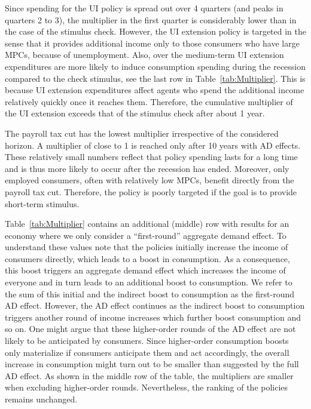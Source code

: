 \documentclass{econsocart}
\begin{document}
Since spending for the UI policy is spread out over 4 quarters (and peaks in quarters 2 to 3), the multiplier in the first quarter is considerably lower than in the case of the stimulus check.
However, the UI extension policy is targeted in the sense that it provides additional income only to those consumers who have large MPCs, because of unemployment.
Also, over the medium-term UI extension expenditures   are more likely to induce consumption spending during the recession compared to the check stimulus, see the last row in Table~\ref{tab:Multiplier}.
This is because UI extension expenditures affect agents who spend the additional income relatively quickly once it reaches them.
Therefore, the cumulative multiplier of the UI extension exceeds that of the stimulus check after about 1 year.



The payroll tax cut has the lowest multiplier irrespective of the considered horizon.
A multiplier of close to 1 is reached only after 10 years with AD effects.
These relatively small numbers reflect that policy spending lasts for a long time and is thus more likely to occur after the recession has ended.
Moreover, only employed consumers, often with relatively low MPCs, benefit directly from the payroll tax cut.
Therefore, the policy is poorly targeted if the goal is to provide short-term stimulus.

Table~\ref{tab:Multiplier} contains an additional (middle) row with results for an economy where we only consider a ``first-round'' aggregate demand effect.
To understand these values note that the policies initially increase the income of consumers directly, which leads to a boost in consumption.
As a consequence, this boost triggers an aggregate demand effect which increases the income of everyone and in turn leads to an additional boost to consumption.
We refer to the sum of this initial and the indirect boost to consumption as the first-round AD effect.
However, the AD effect continues as the indirect boost to consumption triggers another round of income increases which further boost consumption and so on.
One might argue that these higher-order rounds of the AD effect are not likely to be anticipated by consumers.
Since higher-order consumption boosts only materialize if consumers anticipate them and act accordingly, the overall increase in consumption might turn out to be smaller than suggested by the full AD effect.
As shown in the middle row of the table, the multipliers are smaller when excluding higher-order rounds.
Nevertheless, the ranking of the policies remains unchanged.
\end{document}
